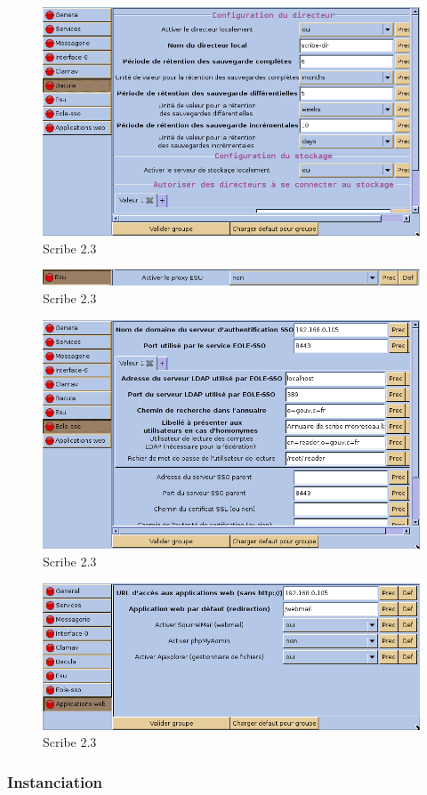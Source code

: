 \documentclass{article}
\makeatletter
\def\maxwidth{\ifdim\Gin@nat@width>\linewidth\linewidth
\else\Gin@nat@width\fi}
\let\Oldincludegraphics\includegraphics
\renewcommand{\includegraphics}[1]{\Oldincludegraphics[width=\maxwidth]{#1}}
\makeatother
\begin{document}
\begin{figure}[htbp]
\centering
\includegraphics{scribe_html_71d87af7.png}
\caption{Scribe 2.3}
\end{figure}

\begin{figure}[htbp]
\centering
\includegraphics{scribe_html_m51dc1543.png}
\caption{Scribe 2.3}
\end{figure}

\begin{figure}[htbp]
\centering
\includegraphics{scribe_html_28489be3.png}
\caption{Scribe 2.3}
\end{figure}

\begin{figure}[htbp]
\centering
\includegraphics{scribe_html_m6ec096b1.png}
\caption{Scribe 2.3 \label{m6ec096b1}}
\end{figure}

\subsubsection{Instanciation}
\end{document}
